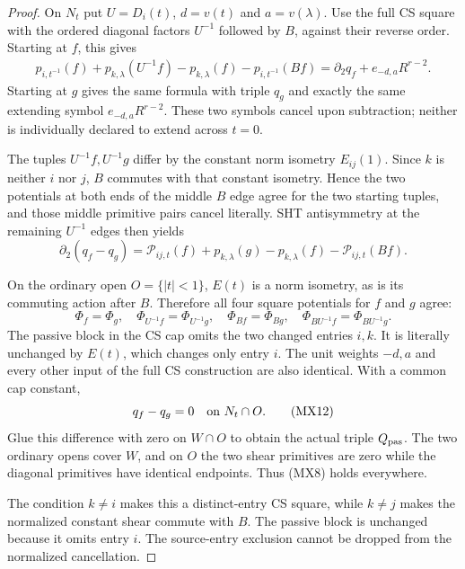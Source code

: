 \begin{proof}
On $N_t$ put $U=D_i(t)$, $d=v(t)$ and $a=v(\lambda)$.
Use the full CS square with the ordered diagonal factors
$U^{-1}$ followed by $B$, against their reverse order.
Starting at $f$, this gives
\[
 \begin{split}
 p_{i,t^{-1}}(f)+p_{k,\lambda}(U^{-1}f)
      -p_{k,\lambda}(f)-p_{i,t^{-1}}(Bf)
         =\partial_2q_f+e_{-d,a}R^{r-2}.
 \end{split}                                                    \tag{MX9}
\]
Starting at $g$ gives the same formula with triple $q_g$
and exactly the same extending symbol $e_{-d,a}R^{r-2}$.
These two symbols cancel upon subtraction; neither is
individually declared to extend across $t=0$.

The tuples $U^{-1}f,U^{-1}g$ differ by the constant norm
isometry $E_{ij}(1)$.  Since $k$ is neither $i$ nor $j$,
$B$ commutes with that constant isometry.  Hence the two
potentials at both ends of the middle $B$ edge agree for
the two starting tuples, and those middle primitive pairs
cancel literally.  SHT antisymmetry at the remaining
$U^{-1}$ edges then yields
\[
 \partial_2(q_f-q_g)
        =\mathcal P_{ij,t}(f)+p_{k,\lambda}(g)
          -p_{k,\lambda}(f)-\mathcal P_{ij,t}(Bf).
                                                               \tag{MX10}
\]

On the ordinary open $O=\{|t|<1\}$, $E(t)$ is a norm
isometry, as is its commuting action after $B$.  Therefore
all four square potentials for $f$ and $g$ agree:
\[
 \Phi_f=\Phi_g,\quad
 \Phi_{U^{-1}f}=\Phi_{U^{-1}g},\quad
 \Phi_{Bf}=\Phi_{Bg},\quad
 \Phi_{BU^{-1}f}=\Phi_{BU^{-1}g}.                               \tag{MX11}
\]
The passive block in the CS cap omits the two changed
entries $i,k$.  It is literally unchanged by $E(t)$,
which changes only entry $i$.  The unit weights $-d,a$
and every other input of the full CS construction are
also identical.  With a common cap constant,
\[
                             q_f-q_g=0\quad\hbox{on }N_t\cap O.
                                                               \tag{MX12}
\]
Glue this difference with zero on $W\cap O$ to obtain
the actual triple $Q_{\rm pas}$.  The two ordinary opens
cover $W$, and on $O$ the two shear primitives are zero
while the diagonal primitives have identical endpoints.
Thus (MX8) holds everywhere.

The condition $k\ne i$ makes this a distinct-entry CS
square, while $k\ne j$ makes the normalized constant
shear commute with $B$.  The passive block is unchanged
because it omits entry $i$.  The source-entry exclusion
cannot be dropped from the normalized cancellation.
\end{proof}

